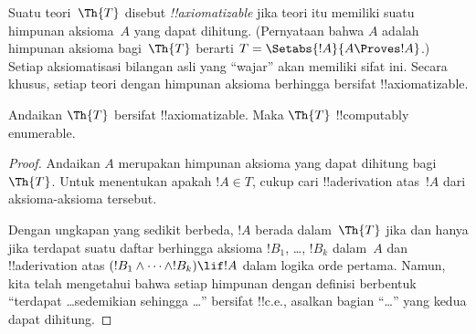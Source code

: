 \documentclass[../../../include/open-logic-section]{subfiles}
\begin{document}


Suatu teori~$\Th{T}$ disebut \emph{!!{axiomatizable}} jika teori itu memiliki
suatu himpunan aksioma~$A$ yang dapat dihitung. (Pernyataan bahwa $A$ adalah
himpunan aksioma bagi~$\Th{T}$ berarti $T = \Setabs{!A}{A \Proves !A}$.)
Setiap aksiomatisasi bilangan asli yang ``wajar'' akan memiliki sifat ini.
Secara khusus, setiap teori dengan himpunan aksioma berhingga bersifat
!!{axiomatizable}.

\begin{lem}
Andaikan $\Th{T}$ bersifat !!{axiomatizable}. Maka $\Th{T}$
!!{computably enumerable}.
\end{lem}

\begin{proof}
Andaikan $A$ merupakan himpunan aksioma yang dapat dihitung bagi~$\Th{T}$.
Untuk menentukan apakah $!A \in T$, cukup cari !!a{derivation} atas~$!A$
dari aksioma-aksioma tersebut.

Dengan ungkapan yang sedikit berbeda, $!A$ berada dalam~$\Th{T}$ jika dan
hanya jika terdapat suatu daftar berhingga aksioma $!B_1$, \dots, $!B_k$
dalam~$A$ dan !!a{derivation} atas $(!B_1 \land \dots \land !B_k) \lif !A$
dalam logika orde pertama. Namun, kita telah mengetahui bahwa setiap himpunan
dengan definisi berbentuk ``terdapat \dots sedemikian sehingga \dots''
bersifat !!{c.e.}, asalkan bagian ``\dots'' yang kedua dapat dihitung.
\end{proof}
\end{document}

